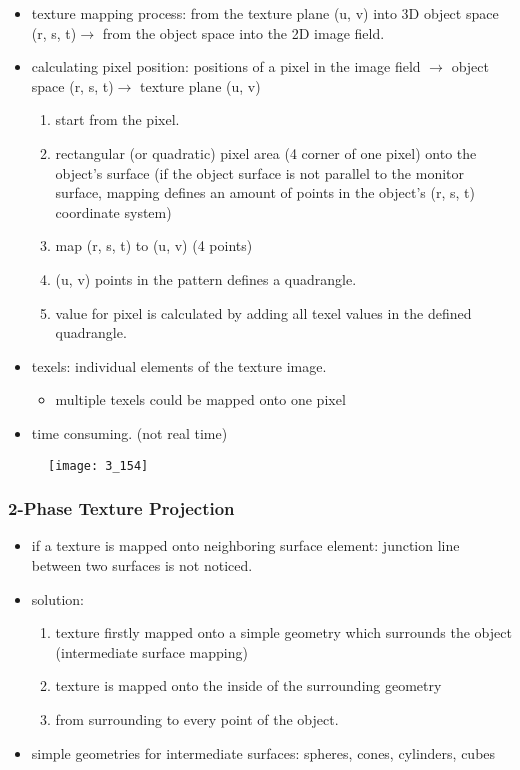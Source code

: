 \documentclass{standalone}
\begin{document}
\begin{itemize}
	\item texture mapping process: from the texture plane (u, v) into 3D object space (r, s, t)$\rightarrow$ from the object space into the 2D image field.
	\item calculating pixel position: positions of a pixel in the image field $\rightarrow$ object space (r, s, t)$\rightarrow$ texture plane (u, v)
		\begin{enumerate}
			\item start from the pixel. 
			\item rectangular (or quadratic) pixel area (4 corner of one pixel) onto the object's surface (if the object surface is not parallel to the monitor surface, mapping defines an amount of points in the object's (r, s, t) coordinate system)
			\item map (r, s, t) to (u, v) (4 points) 
			\item (u, v) points in the pattern defines a quadrangle. 
			\item value for pixel is calculated by adding all texel values in the defined quadrangle.
		\end{enumerate}
	\item texels: individual elements of the texture image.
		\begin{itemize}
			\item multiple texels could be mapped onto one pixel
		\end{itemize}
	\item time consuming. (not real time)
\end{itemize}

\begin{figure}[H]
	\texttt{[image: 3\_154]}
\end{figure} 

\subsubsection*{2-Phase Texture Projection}

\begin{itemize}
	\item if a texture is mapped onto neighboring surface element: junction line between two surfaces is not noticed.
	\item solution:
		\begin{enumerate}
			\item texture firstly mapped onto a simple geometry which surrounds the object (intermediate surface mapping) 
			\item texture is mapped onto the inside of the surrounding geometry
			\item from surrounding to every point of the object.
		\end{enumerate} 
	\item simple geometries for intermediate surfaces: spheres, cones, cylinders, cubes
\end{itemize}       
\end{document}
